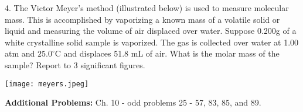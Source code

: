 \documentclass[11pt]{article}
\begin{document}

\vspace{2.5in}

4. The Victor Meyer's method (illustrated below) is used to measure molecular mass. This
is accomplished by vaporizing a known mass of a volatile solid or liquid and measuring
the volume of air displaced over water. Suppose 0.200g of a white crystalline solid sample is
vaporized. The gas is collected over water at 1.00 atm and $25.0^\circ\text{C}$ and displaces
51.8 mL of air. What is the molar mass of the sample? Report to 3 significant figures.

\begin{center}
  \texttt{[image: meyers.jpeg]}
\end{center}

% 

\vfill
\textbf{Additional Problems:} Ch. 10 - odd problems 25 - 57, 83, 85, and 89.



\end{document}
